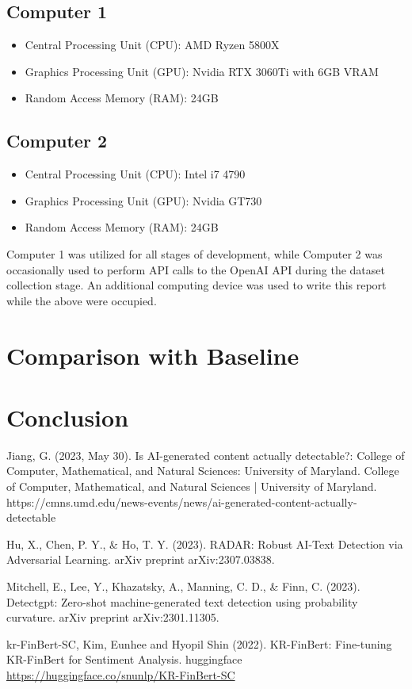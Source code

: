 \documentclass{article}
\begin{document}
\subsection{Computer 1}
\begin{itemize}
    \item Central Processing Unit (CPU): AMD Ryzen 5800X
    \item Graphics Processing Unit (GPU): Nvidia RTX 3060Ti with 6GB VRAM
    \item Random Access Memory (RAM): 24GB
\end{itemize}

\subsection{Computer 2}
\begin{itemize}
    \item Central Processing Unit (CPU): Intel i7 4790
    \item Graphics Processing Unit (GPU): Nvidia GT730
    \item Random Access Memory (RAM): 24GB
\end{itemize}

Computer 1 was utilized for all stages of development, while Computer 2 was occasionally used to perform API calls to the OpenAI API during the dataset collection stage.
An additional computing device was used to write this report while the above were occupied.

\section{Comparison with Baseline}

\section{Conclusion}



Jiang, G. (2023, May 30). Is AI-generated content actually detectable?: College of Computer, Mathematical, and Natural Sciences: University of Maryland. College of Computer, Mathematical, and Natural Sciences | University of Maryland. https://cmns.umd.edu/news-events/news/ai-generated-content-actually-detectable 

Hu, X., Chen, P. Y., \& Ho, T. Y. (2023). RADAR: Robust AI-Text Detection via Adversarial Learning. arXiv preprint arXiv:2307.03838.

Mitchell, E., Lee, Y., Khazatsky, A., Manning, C. D., \& Finn, C. (2023). Detectgpt: Zero-shot machine-generated text detection using probability curvature. arXiv preprint arXiv:2301.11305.

kr-FinBert-SC, Kim, Eunhee and Hyopil Shin (2022). KR-FinBert: Fine-tuning KR-FinBert for Sentiment Analysis. huggingface \url{https://huggingface.co/snunlp/KR-FinBert-SC}
\end{document}
